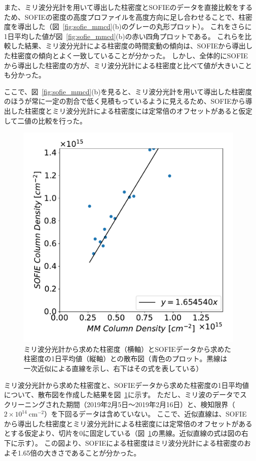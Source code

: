 また、ミリ波分光計を用いて導出した柱密度とSOFIEのデータを直接比較をするため、SOFIEの密度の高度プロファイルを高度方向に足し合わせることで、柱密度を導出した（図~\ref{fig:sofie_mmcd}(b)のグレーの丸形プロット）。
これをさらに1日平均した値が図~\ref{fig:sofie_mmcd}(b)の赤い四角プロットである。
これらを比較した結果、ミリ波分光計による柱密度の時間変動の傾向は、SOFIEから導出した柱密度の傾向とよく一致していることが分かった。
しかし、全体的にSOFIEから導出した柱密度の方が、ミリ波分光計による柱密度と比べて値が大きいことも分かった。\par

ここで、図~\ref{fig:sofie_mmcd}(b)を見ると、ミリ波分光計を用いて導出した柱密度のほうが常に一定の割合で低く見積もっているように見えるため、SOFIEから導出した柱密度とミリ波分光計による柱密度には定常倍のオフセットがあると仮定して二値の比較を行った。
\begin{figure}[htbp]
    \centering
    \includegraphics[scale=0.5]{master_thesis_contents/master_thesis_fig/sofie_mmcd_sofiecd_corr.pdf}
    \caption{ミリ波分光計から求めた柱密度（横軸）とSOFIEデータから求めた柱密度の1日平均値（縦軸）との散布図（青色のプロット。黒線は一次近似による直線を示し、右下はその式を表している）}
    \label{fig:sofie_mmcd_sofiecd_corr}
\end{figure}
ミリ波分光計から求めた柱密度と、SOFIEデータから求めた柱密度の1日平均値について、散布図を作成した結果を図~\ref{fig:sofie_mmcd_sofiecd_corr}に示す。
ただし、ミリ波のデータでスクリーニングされた期間（2019年2月5日〜2019年2月16日）と、検知限界（$2\times 10^{14}\ \mathrm{cm^{-2}}$）を下回るデータは含めていない。
ここで、近似直線は、SOFIEから導出した柱密度とミリ波分光計による柱密度には定常倍のオフセットがあるとする仮定より、切片を0に固定している（図~\ref{fig:sofie_mmcd_sofiecd_corr}の黒線。近似直線の式は図の右下に示す）。
この図より、SOFIEによる柱密度はミリ波分光計による柱密度のおよそ1.65倍の大きさであることが分かった。\par

